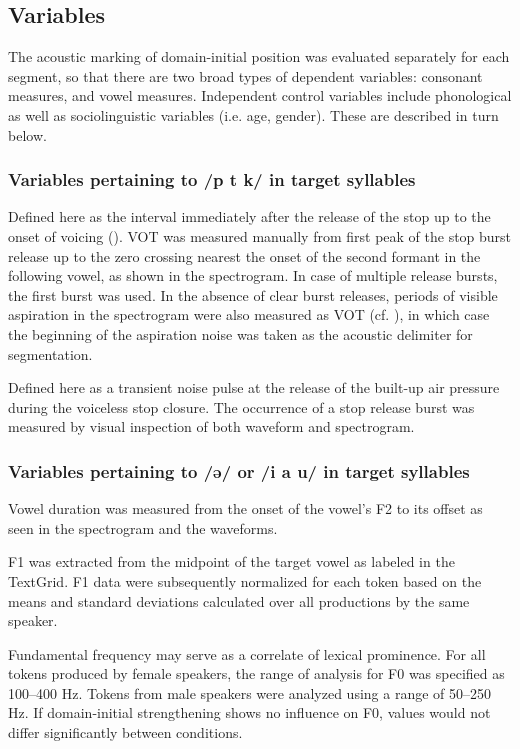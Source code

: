 \documentclass[output=paper]{langscibook}
\begin{document}
\subsection{Variables }
The acoustic marking of domain-initial position was evaluated separately for each segment, so that there are two broad types of dependent variables: consonant measures, and vowel measures. Independent control variables include phonological as well as sociolinguistic variables (i.e. age, gender). These are described in turn below.


\subsubsection{Variables pertaining to /p t k/ in target syllables}
Defined here as the interval immediately after the release of the stop up to the onset of voicing (\citealt{la64}). VOT was measured manually from first peak of the stop burst release up to the zero crossing nearest the onset of the second formant in the following vowel, as shown in the spectrogram. In case of multiple release bursts, the first burst was used. In the absence of clear burst releases, periods of visible aspiration in the spectrogram were also measured as VOT (cf. \citealt{aw17}), in which case the beginning of the aspiration noise was taken as the acoustic delimiter for segmentation.

\largerpage
Defined here as a transient noise pulse at the release of the built-up air pressure during the voiceless stop closure. The occurrence of a stop release burst was measured by visual inspection of both waveform and spectrogram.

\subsubsection{Variables pertaining to /ə/ or /i a u/ in target syllables}
Vowel duration was measured from the onset of the vowel’s F2 to its offset as seen in the spectrogram and the waveforms. 

F1 was extracted from the midpoint of the target vowel as labeled in the TextGrid. F1 data were subsequently normalized for each token based on the means and standard deviations calculated over all productions by the same speaker. 

Fundamental frequency may serve as a correlate of lexical prominence. For all tokens produced by female speakers, the range of analysis for F0 was specified as 100--400 Hz. Tokens from male speakers were analyzed using a range of 50--250 Hz. If domain-initial strengthening shows no influence on F0, values would not differ significantly between conditions. 
\end{document}
